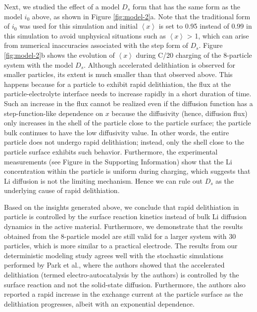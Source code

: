 \documentclass{article}
\begin{document}
Next, we studied the effect of a model $D_s$ form that has the same
form as the model $i_0$ above, as shown in Figure
\ref{fig:model-2}a. Note that the traditional form of $i_0$ was used
for this simulation and initial $\left\langle x\right\rangle$ is set
to 0.95 instead of 0.99 in this simulation to avoid unphysical
situations such as $\left\langle x\right\rangle$ > 1, which can arise
from numerical inaccuracies associated with the step form of
$D_s$. Figure \ref{fig:model-2}b shows the evolution of $\left\langle
x \right\rangle$ during C/20 charging of the 8-particle system with
the model $D_s$. Although accelerated delithiation is observed for
smaller particles, its extent is much smaller than that observed
above. This happens because for a particle to exhibit rapid
delithiation, the flux at the particle-electrolyte interface needs to
increase rapidly in a short duration of time. Such an increase in the
flux cannot be realized even if the diffusion function has a
step-function-like dependence on $x$ because the diffusivity (hence,
diffusion flux) only increases in the shell of the particle close to
the particle surface; the particle bulk continues to have the low
diffusivity value. In other words, the entire particle does not
undergo rapid delithiation; instead, only the shell close to the
particle surface exhibits such behavior. Furthermore, the experimental
measurements (see Figure  in the Supporting Information) show that
the Li concentration within the particle is uniform during charging,
which suggests that Li diffusion is not the limiting mechanism. Hence
we can rule out $D_s$ as the underlying cause of rapid delithiation.

Based on the insights generated above, we conclude that rapid
delithiation in \nca{} particle is controlled by the surface reaction
kinetics instead of bulk Li diffusion dynamics in the active
material. Furthermore, we demonstrate that the results obtained from
the 8-particle model are still valid for a larger system with 30
particles, which is more similar to a practical electrode. The results
from our deterministic modeling study agrees well with the stochastic
simulations performed by Park et al.\cite{chueh2021}, where the
authors showed that the accelerated delithiation (termed
electro-autocatalysis by the authors) is controlled by the surface
reaction and not the solid-state diffusion. Furthermore, the authors
also reported a rapid increase in the exchange current at the \nca{}
particle surface as the delithiation progresses, albeit with an
exponential dependence.
\end{document}
